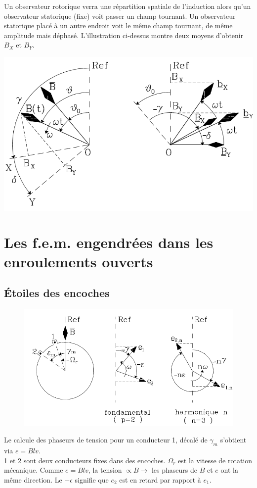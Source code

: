 	Un observateur rotorique verra une répartition spatiale de l'induction alors 
	qu'un observateur statorique (fixe) voit passer un champ tournant. Un 
	observateur statorique placé à un autre endroit voit le même champ tournant, 
	de même amplitude mais déphasé. L'illustration ci-dessus montre deux moyens 
	d'obtenir $B_X$ et $B_Y$.
	\begin{center}
	\includegraphics[scale=0.34]{ch5/image4.png}
	\end{center}
	

\section{Les f.e.m. engendrées dans les enroulements ouverts}
	\subsection{Étoiles des encoches}
		\begin{figure}
	\vspace{-5mm}
	\includegraphics[scale=0.38]{ch5/image5.png}
	\end{figure}
	Le calcule des phaseurs de tension pour un conducteur 1, décalé de 
	$\gamma_m$ s'obtient via $e= Blv$.\\
			1 et 2 sont deux conducteurs fixes dans des encoches. $\Omega_r$ 
	est la vitesse de rotation mécanique. Comme $e=Blv$, la tension $\propto B \rightarrow$ 
	les phaseurs de $B$ et $e$ ont la même direction. Le $-\epsilon$ signifie que $e_2$ 
	est en retard par rapport à $e_1$.\\
	

